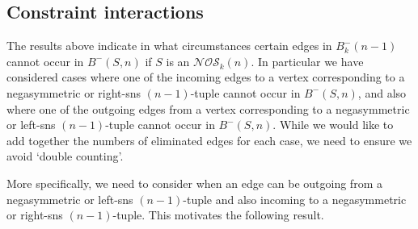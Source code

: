 \documentclass[a4paper,11pt]{article}
\theoremstyle{plain}
\theoremstyle{definition}
\theoremstyle{remark}
\begin{document}
\subsection{Constraint interactions}  \label{subsection:NOS-constraint-interactions}

The results above indicate in what circumstances certain edges in $B^-_k(n-1)$ cannot occur in
$B^-(S,n)$ if $S$ is an $\mathcal{NOS}_k(n)$.  In particular we have considered cases where one of
the incoming edges to a vertex corresponding to a negasymmetric or right-sns $(n-1)$-tuple cannot
occur in $B^-(S,n)$, and also where one of the outgoing edges from a vertex corresponding to a
negasymmetric or left-sns $(n-1)$-tuple cannot occur in $B^-(S,n)$. While we would like to add
together the numbers of eliminated edges for each case, we need to ensure we avoid `double
counting'.

More specifically, we need to consider when an edge can be outgoing from a negasymmetric or
left-sns $(n-1)$-tuple and also incoming to a negasymmetric or right-sns $(n-1)$-tuple.  This
motivates the following result.
\end{document}
